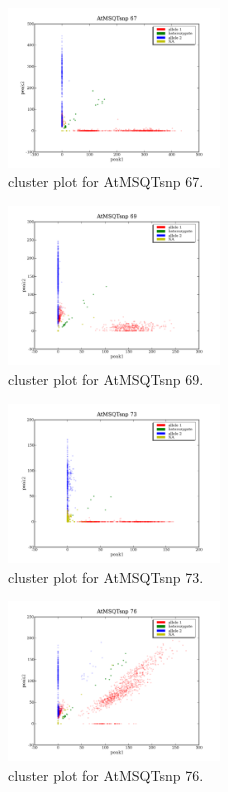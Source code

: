 \begin{figure}[H]
\includegraphics[width=0.5\textwidth]{figures/cluster_plot_AtMSQTsnp_67.png}
\caption{cluster plot for AtMSQTsnp 67.} \label{flAtMSQTsnp67}
\end{figure}

\begin{figure}[H]
\includegraphics[width=0.5\textwidth]{figures/cluster_plot_AtMSQTsnp_69.png}
\caption{cluster plot for AtMSQTsnp 69.} \label{flAtMSQTsnp69}
\end{figure}

\begin{figure}[H]
\includegraphics[width=0.5\textwidth]{figures/cluster_plot_AtMSQTsnp_73.png}
\caption{cluster plot for AtMSQTsnp 73.} \label{flAtMSQTsnp73}
\end{figure}

\begin{figure}[H]
\includegraphics[width=0.5\textwidth]{figures/cluster_plot_AtMSQTsnp_76.png}
\caption{cluster plot for AtMSQTsnp 76.} \label{flAtMSQTsnp76}
\end{figure}

